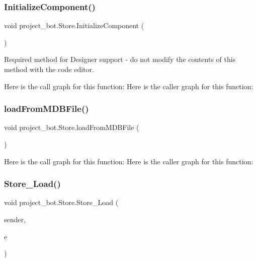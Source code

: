 \subsubsection{\texorpdfstring{Initialize\+Component()}{InitializeComponent()}}
{\footnotesize\ttfamily void project\+\_\+bot.\+Store.\+Initialize\+Component (\begin{DoxyParamCaption}{ }\end{DoxyParamCaption})\hspace{0.3cm}{\ttfamily [private]}}



Required method for Designer support -\/ do not modify the contents of this method with the code editor. 

Here is the call graph for this function\+:
Here is the caller graph for this function\+:
\mbox{\label{classproject__bot_1_1_store_aae062aa9b620a02c4ccb9ab8409eb8bc}} 
\subsubsection{\texorpdfstring{load\+From\+M\+D\+B\+File()}{loadFromMDBFile()}}
{\footnotesize\ttfamily void project\+\_\+bot.\+Store.\+load\+From\+M\+D\+B\+File (\begin{DoxyParamCaption}{ }\end{DoxyParamCaption})}

Here is the call graph for this function\+:
Here is the caller graph for this function\+:
\mbox{\label{classproject__bot_1_1_store_a72c22ca4fb81518a9de8a519badd7e52}} 
\subsubsection{\texorpdfstring{Store\+\_\+\+Load()}{Store\_Load()}}
{\footnotesize\ttfamily void project\+\_\+bot.\+Store.\+Store\+\_\+\+Load (\begin{DoxyParamCaption}\item[{object}]{sender,  }\item[{Event\+Args}]{e }\end{DoxyParamCaption})\hspace{0.3cm}{\ttfamily [private]}}

